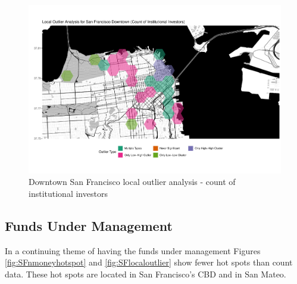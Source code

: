 \begin{figure}
	\centering
	\includegraphics[width=1\linewidth]{Figures/ChapterIV/SF_Count_LO_Downtown}
	\caption[Downtown San Francisco Local Outlier Analysis - Count of Institutional Investors 1999-2018]{Downtown San Francisco local outlier analysis - count of institutional investors}
	\label{fig:SFcountlocaloutliercount_Downtown}
\end{figure}

\subsection{Funds Under Management}

In a continuing theme of having the funds under management Figures \ref{fig:SFnmoneyhotspot} and \ref{fig:SFlocaloutlier} show fewer hot spots than count data.  These hot spots are located in San Francisco's CBD and in San Mateo.  	

